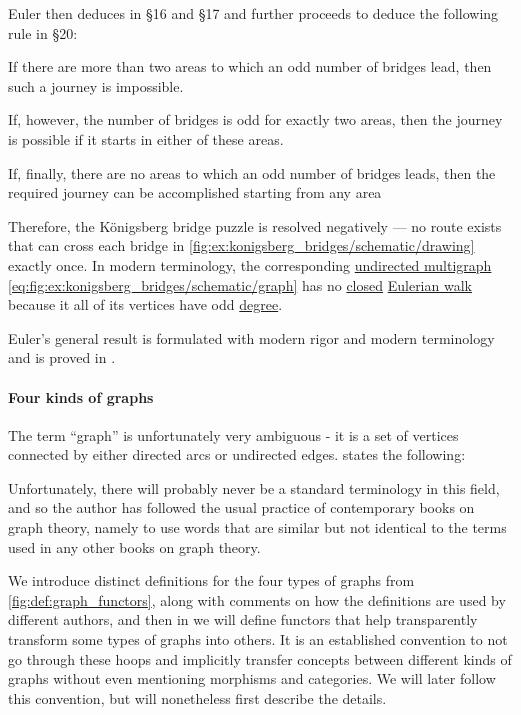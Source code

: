 \begin{example}
  Euler then deduces  in \S 16 and \S 17 and further proceeds to deduce the following rule in \S 20:
  \begin{displayquote}
    If there are more than two areas to which an odd number of bridges lead, then such a journey is impossible.

    If, however, the number of bridges is odd for exactly two areas, then the journey is possible if it starts in either of these areas.

    If, finally, there are no areas to which an odd number of bridges leads, then the required journey can be accomplished starting from any area
  \end{displayquote}

  Therefore, the K\"onigsberg bridge puzzle is resolved negatively --- no route exists that can cross each bridge in \cref{fig:ex:konigsberg_bridges/schematic/drawing} exactly once. In modern terminology, the corresponding \hyperref[def:hypergraph/multigraph]{undirected multigraph} \eqref{eq:fig:ex:konigsberg_bridges/schematic/graph} has no \hyperref[def:graph_walk/closed]{closed} \hyperref[def:eulerian_walk]{Eulerian walk} because it all of its vertices have odd \hyperref[def:graph_cardinality/undirected_degree]{degree}.

  Euler's general result is formulated with modern rigor and modern terminology and is proved in .
\end{example}

\paragraph{Four kinds of graphs}\hfill

The term \enquote{graph} is unfortunately very ambiguous - it is a set of vertices connected by either directed arcs or undirected edges.  states the following:
\begin{displayquote}
  Unfortunately, there will probably never be a standard terminology in this field, and so the author has followed the usual practice of contemporary books on graph theory, namely to use words that are similar but not identical to the terms used in any other books on graph theory.
\end{displayquote}

 We introduce distinct definitions for the four types of graphs from \cref{fig:def:graph_functors}, along with comments on how the definitions are used by different authors, and then in  we will define functors that help transparently transform some types of graphs into others. It is an established convention to not go through these hoops and implicitly transfer concepts between different kinds of graphs without even mentioning morphisms and categories. We will later follow this convention, but will nonetheless first describe the details.


